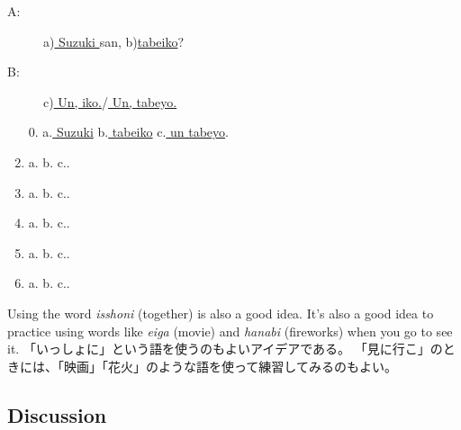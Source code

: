 \documentclass[uplatex,dvipdfmx,b5paper,english,10pt]{jsbook}
\begin{document}
\begin{description}
 \item[A:] a)\underline{ Suzuki } san, b)\underline{tabeiko}?
 \item[B:] c)\underline{ Un, iko.}/\underline{ Un, tabeyo.}
\end{description}

\begin{enumerate}
  \item[0.] a.\underline{ Suzuki\hspace{6.5zw}} b.\underline{ tabeiko\hspace{6.2zw}} c.\underline{ un tabeyo\hspace{7.0zw}}.
  \item a.\underline{\hspace{10zw}} b.\underline{\hspace{10zw}}  c.\underline{\hspace{12zw}}.
  \item a.\underline{\hspace{10zw}} b.\underline{\hspace{10zw}}  c.\underline{\hspace{12zw}}.
  \item a.\underline{\hspace{10zw}} b.\underline{\hspace{10zw}}  c.\underline{\hspace{12zw}}.
  \item a.\underline{\hspace{10zw}} b.\underline{\hspace{10zw}}  c.\underline{\hspace{12zw}}.
  \item a.\underline{\hspace{10zw}} b.\underline{\hspace{10zw}}  c.\underline{\hspace{12zw}}.
\end{enumerate}

\begin{toianswer}
\ifEnglish
Using the word {\it isshoni\/} (together) is also a good idea.
It's also a good idea to practice using words like {\it eiga\/} (movie) and {\it hanabi\/} (fireworks) when you go to see it.
\else
「いっしょに」という語を使うのもよいアイデアである。
「見に行こ」のときには、「映画」「花火」のような語を使って練習してみるのもよい。
\fi
\end{toianswer}

\ifEnglish
\subsection{Discussion}
\else
\end{document}
